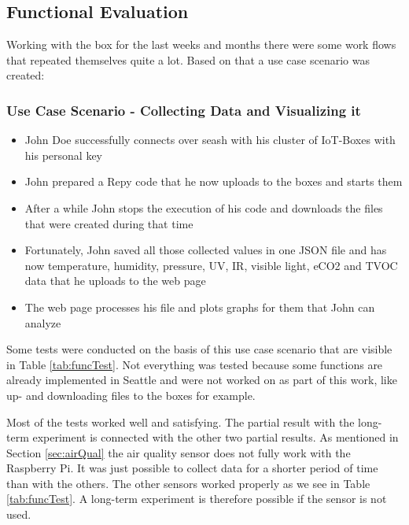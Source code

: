 \documentclass[bachelorthesis, grey, english]{mas-thesis-chapters} %
\begin{document}
\subsection{Functional Evaluation}

Working with the box for the last weeks and months there were some work flows that repeated themselves quite a lot. Based on that a use case scenario was created:

\subsubsection*{\textbf{Use Case Scenario - Collecting Data and Visualizing it}}

\begin{itemize}
  \setlength\itemsep{0em}
  \item John Doe successfully connects over \gls{seash} with his cluster of \gls{IoT}-Boxes with his personal key
  \item John prepared a \gls{Repy} code that he now uploads to the boxes and starts them
  \item After a while John stops the execution of his code and downloads the files that were created during that time
  \item Fortunately, John saved all those collected values in one JSON file and has now temperature, humidity, pressure, \gls{UV}, \gls{IR}, visible light, \gls{eCO2} and \gls{TVOC} data that he uploads to the web page
  \item The web page processes his file and plots graphs for them that John can analyze
\end{itemize}

Some tests were conducted on the basis of this use case scenario that are visible in Table \ref{tab:funcTest}. Not everything was tested because some functions are already implemented in Seattle and were not worked on as part of this work, like up- and downloading files to the boxes for example.

Most of the tests worked well and satisfying. The partial result with the long-term experiment is connected with the other two partial results. As mentioned in Section \ref{sec:airQual} the air quality sensor does not fully work with the Raspberry Pi. It was just possible to collect data for a shorter period of time than with the others. The other sensors worked properly as we see in Table \ref{tab:funcTest}. A long-term experiment is therefore possible if the sensor is not used.
\end{document}
